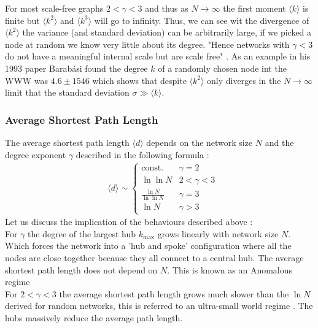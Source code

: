 \documentclass{article}
\begin{document}
                For most scale-free graphs $2<\gamma<3$ and thus as $N\to \infty$ the first moment $\langle k \rangle$ is finite but $\langle k^2 \rangle$ and $\langle k^3 \rangle$ will go to infinity. Thus, we can see wit the divergence of $\langle k^2 \rangle$ the variance (and standard deviation) can be arbitrarily large, if we picked a node at random we know very little about its degree. "Hence networks with $\gamma<3$ do not have a meaningful internal scale but are scale free" \parencite{barabasi2013network}. As an example in his 1993 paper Barabási found the degree $k$ of a randomly chosen node int the WWW was $4.6 \pm 1546$ which shows that despite $\langle k^2 \rangle$ only diverges in the $N \to \infty$ limit that the standard deviation $\sigma \gg  \langle k \rangle$.\\
            \subsubsection{Average Shortest Path Length}
            The average shortest path length $\langle d \rangle$ depends on the network size $N$ and the degree exponent $\gamma$ described in the following formula \parencite{bollobas2004diameter}\parencite{cohen2003scale}:\\
            \begin{align*}
                &\langle d \rangle \sim
                \begin{cases}
                    \text{const.} &\gamma =2\\
                    \ln\ln N  &2<\gamma<3\\
                    \frac{\ln N}{\ln\ln N}  &\gamma = 3\\
                    \ln N  &\gamma>3
                \end{cases}
            \end{align*}
            Let us discuss the implication of the behaviours described above \parencite{barabasi2013network}:\\
            For $\gamma$ the degree of the largest hub $k_{\text{max}}$ grows linearly with network size $N$. Which forces the network into a 'hub and spoke' configuration where all the nodes are close together because they all connect to a central hub. The average shortest path length does not depend on $N$. This is known as an Anomalous regime\\
            For $2<\gamma<3$ the average shortest path length grows much slower than the $\ln N$ derived for random networks, this is referred to an ultra-small world regime \parencite{cohen2003scale}. The hubs massively reduce the average path length.\\
\end{document}
